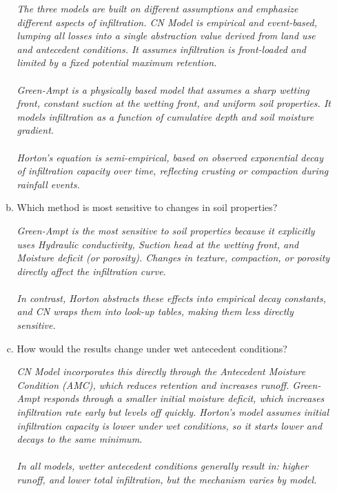 \documentclass[12pt]{article}
\begin{document}
\begin{enumerate}
\begin{enumerate}[a)]
\textsl{The three models are built on different assumptions and emphasize different aspects of infiltration. CN Model is empirical and event-based, lumping all losses into a single abstraction value derived from land use and antecedent conditions. It assumes infiltration is front-loaded and limited by a fixed potential maximum retention.\\ \\Green-Ampt is a physically based model that assumes a sharp wetting front, constant suction at the wetting front, and uniform soil properties. It models infiltration as a function of cumulative depth and soil moisture gradient.\\ \\ Horton’s equation is semi-empirical, based on observed exponential decay of infiltration capacity over time, reflecting crusting or compaction during rainfall events.}
        \item Which method is most sensitive to changes in soil properties?  

        \textsl{Green-Ampt is the most sensitive to soil properties because it explicitly uses Hydraulic conductivity, Suction head at the wetting front, and Moisture deficit (or porosity). Changes in texture, compaction, or porosity directly affect the infiltration curve.\\ \\ In contrast, Horton abstracts these effects into empirical decay constants, and CN wraps them into look-up tables, making them less directly sensitive.}
        \item How would the results change under wet antecedent conditions?

        \textsl{CN Model incorporates this directly through the Antecedent Moisture Condition (AMC), which reduces retention and increases runoff. Green-Ampt responds through a smaller initial moisture deficit, which increases infiltration rate early but levels off quickly. Horton’s model assumes initial infiltration capacity is lower under wet conditions, so it starts lower and decays to the same minimum. \\ \\ In all models, wetter antecedent conditions generally result in: higher runoff, and lower total infiltration, but the mechanism varies by model.}
        

\end{enumerate}
\end{enumerate}
\end{document}
